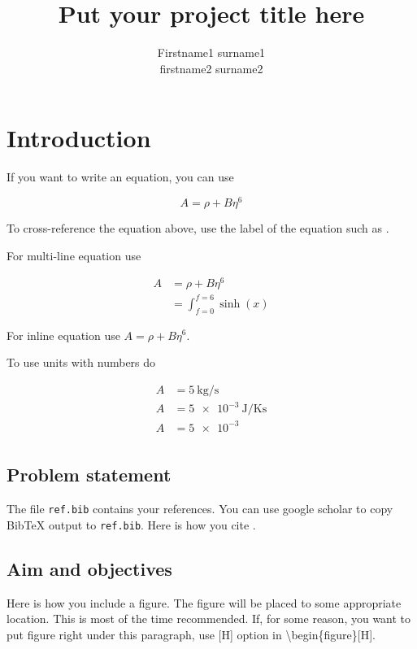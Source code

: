 \documentclass{template}
\title{Put your project title here}
\author{Firstname1 surname1\\ firstname2 surname2}
\begin{document}
\chapter{Introduction}\label{ch:in}

If you want to write an equation, you can use

\begin{equation}\label{eq:A}
A = \rho + B\eta^6
\end{equation}

To cross-reference the equation above, use the label of the equation such as .

For multi-line equation use

\begin{equation}
\begin{aligned}
A &= \rho + B\eta^6\\
  &= \int_{f=0}^{f=6} \sinh(x)
\end{aligned}
\end{equation}

For inline equation use $A = \rho + B\eta^6$.

To use units with numbers do

\begin{equation}
\begin{aligned}
A &= \SI{5}{\kg\per\s}\\
A &= \SI{5e-3}{\joule\per\kelvin\s}\\
A &= \num{5e-3}\\
\end{aligned}
\end{equation}


\section{Problem statement}

The file \texttt{ref.bib} contains your references. You can use google scholar to copy BibTeX output to \texttt{ref.bib}. Here is how you cite \cite{gulawani2006cfd}.

\section{Aim and objectives}

Here is how you include a figure. The figure will be placed to some appropriate location. This is most of the time recommended. If, for some reason, you want to put figure right under this paragraph, use [H] option in \textbackslash begin\{figure\}[H].
\end{document}
